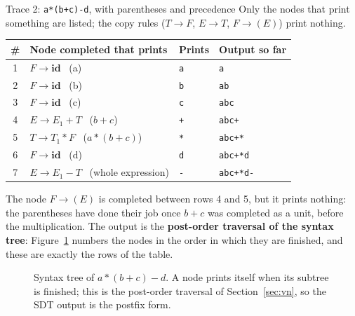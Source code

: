 \documentclass[11pt,a4paper]{article}
\begin{document}
\begin{examplebox}{Trace 2: \texttt{a*(b+c)-d}, with parentheses and precedence}
Only the nodes that print something are listed; the copy rules ($T\to F$, $E\to T$, $F\to(E)$) print nothing.
\begin{center}
\small
\begin{tabular}{@{}c l l l@{}}
\toprule
\textbf{\#} & \textbf{Node completed that prints} & \textbf{Prints} & \textbf{Output so far} \\ \midrule
1 & $F\to\mathbf{id}$ \ (a)            & \texttt{a} & \texttt{a} \\
2 & $F\to\mathbf{id}$ \ (b)            & \texttt{b} & \texttt{ab} \\
3 & $F\to\mathbf{id}$ \ (c)            & \texttt{c} & \texttt{abc} \\
4 & $E\to E_1+T$ \ ($b+c$)             & \texttt{+} & \texttt{abc+} \\
5 & $T\to T_1*F$ \ ($a*(b+c)$)         & \texttt{*} & \texttt{abc+*} \\
6 & $F\to\mathbf{id}$ \ (d)            & \texttt{d} & \texttt{abc+*d} \\
7 & $E\to E_1-T$ \ (whole expression)  & \texttt{-} & \texttt{abc+*d-} \\ \bottomrule
\end{tabular}
\end{center}
The node $F\to(E)$ is completed between rows 4 and 5, but it prints nothing: the parentheses have done their job once $b+c$ was completed as a unit, before the multiplication. The output is the \textbf{post-order traversal of the syntax tree}: Figure~\ref{fig:postfixtree} numbers the nodes in the order in which they are finished, and these are exactly the rows of the table.

\begin{figure}[H]
\centering
{}
\caption{Syntax tree of $a*(b+c)-d$. A node prints itself when its subtree is finished; this is the post-order traversal of Section~\ref{sec:vn}, so the SDT output is the postfix form.}
\label{fig:postfixtree}
\end{figure}
\end{examplebox}
\end{document}

